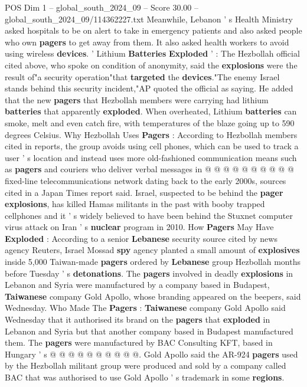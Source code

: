 \begin{textsample}{POS Dim 1 – global\_south\_2024\_09 – Score 30.00 – global\_south\_2024\_09/114362227.txt}
Meanwhile, Lebanon ' s Health Ministry asked hospitals to be on alert to take in emergency patients and also asked people who own \textbf{pagers} to get away from them.
It also asked health workers to avoid using wireless \textbf{devices}. ' Lithium \textbf{Batteries} \textbf{Exploded} ' : The Hezbollah official cited above, who spoke on condition of anonymity, said the \textbf{explosions} were the result of"a security operation"that \textbf{targeted} the \textbf{devices}."The enemy Israel stands behind this security incident,"AP quoted the official as saying.
He added that the new \textbf{pagers} that Hezbollah members were carrying had lithium \textbf{batteries} that apparently \textbf{exploded}.
When overheated, Lithium \textbf{batteries} can smoke, melt and even catch fire, with temperatures of the blaze going up to 590 degrees Celsius.
Why Hezbollah Uses \textbf{Pagers} : According to Hezbollah members cited in reports, the group avoids using cell phones, which can be used to track a user ' s location and instead uses more old-fashioned communication means such as \textbf{pagers} and couriers who deliver verbal messages in @ @ @ @ @ @ @ @ @ @ fixed-line telecommunications network dating back to the early 2000s, sources cited in a Japan Times report said.
Israel, suspected to be behind the \textbf{pager} \textbf{explosions}, has killed Hamas militants in the past with booby trapped cellphones and it ' s widely believed to have been behind the Stuxnet computer virus attack on Iran ' s \textbf{nuclear} program in 2010.
How \textbf{Pagers} May Have \textbf{Exploded} : According to a senior \textbf{Lebanese} security source cited by news agency Reuters, Israel Mossad \textbf{spy} agency planted a small amount of \textbf{explosives} inside 5,000 Taiwan-made \textbf{pagers} ordered by \textbf{Lebanese} group Hezbollah months before Tuesday ' s \textbf{detonations}.
The \textbf{pagers} involved in deadly \textbf{explosions} in Lebanon and Syria were manufactured by a company based in Budapest, \textbf{Taiwanese} company Gold Apollo, whose branding appeared on the beepers, said Wednesday.
Who Made The \textbf{Pagers} : \textbf{Taiwanese} company Gold Apollo said Wednesday that it authorised its brand on the \textbf{pagers} that \textbf{exploded} in Lebanon and Syria but that another company based in Budapest manufactured them.
The \textbf{pagers} were manufactured by BAC Consulting KFT, based in Hungary ' s @ @ @ @ @ @ @ @ @ @.
Gold Apollo said the AR-924 \textbf{pagers} used by the Hezbollah militant group were produced and sold by a company called BAC that was authorised to use Gold Apollo ' s trademark in some \textbf{regions}.

\end{textsample}
